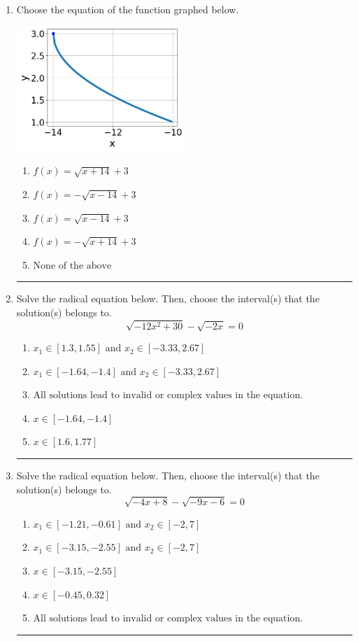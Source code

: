 \documentclass[14pt]{extbook}
\newcommand{\litem}[1]{\item#1\hspace*{-1cm}\rule{\textwidth}{0.4pt}}
\begin{document}
\begin{enumerate}
{\begin{enumerate}[label=\Alph*.]
\end{enumerate} }
\litem{
Choose the equation of the function graphed below.
\begin{center}
    \includegraphics[width=0.5\textwidth]{../Figures/radicalGraphToEquationB.png}
\end{center}
\begin{enumerate}[label=\Alph*.]
\item \( f(x) = \sqrt{x + 14} + 3 \)
\item \( f(x) = - \sqrt{x - 14} + 3 \)
\item \( f(x) = \sqrt{x - 14} + 3 \)
\item \( f(x) = - \sqrt{x + 14} + 3 \)
\item \( \text{None of the above} \)

\end{enumerate} }
\litem{
Solve the radical equation below. Then, choose the interval(s) that the solution(s) belongs to.\[ \sqrt{-12 x^2 + 30} - \sqrt{-2 x} = 0 \]\begin{enumerate}[label=\Alph*.]
\item \( x_1 \in [1.3, 1.55] \text{ and } x_2 \in [-3.33,2.67] \)
\item \( x_1 \in [-1.64, -1.4] \text{ and } x_2 \in [-3.33,2.67] \)
\item \( \text{All solutions lead to invalid or complex values in the equation.} \)
\item \( x \in [-1.64,-1.4] \)
\item \( x \in [1.6,1.77] \)

\end{enumerate} }
\litem{
Solve the radical equation below. Then, choose the interval(s) that the solution(s) belongs to.\[ \sqrt{-4 x + 8} - \sqrt{-9 x - 6} = 0 \]\begin{enumerate}[label=\Alph*.]
\item \( x_1 \in [-1.21, -0.61] \text{ and } x_2 \in [-2,7] \)
\item \( x_1 \in [-3.15, -2.55] \text{ and } x_2 \in [-2,7] \)
\item \( x \in [-3.15,-2.55] \)
\item \( x \in [-0.45,0.32] \)
\item \( \text{All solutions lead to invalid or complex values in the equation.} \)


\end{enumerate}}
\end{enumerate}
\end{document}
